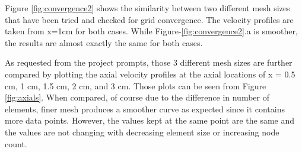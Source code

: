 \noindent Figure \ref{fig:convergence2} shows the similarity between two different mesh sizes that have been tried and checked for grid convergence. The velocity profiles are taken from x=1cm for both cases. While Figure-\ref{fig:convergence2}.a is smoother, the results are almost exactly the same for both cases.

\begin{figure}[H]
\end{figure}


\noindent As requested from the project prompts, those 3 different mesh sizes are further compared by
plotting the axial velocity profiles at the axial locations of x = 0.5 cm, 1 cm,
1.5 cm, 2 cm, and 3 cm. Those plots can be seen from Figure \ref{fig:axials}. When compared, of course due to the difference in number of elements, finer mesh produces a smoother curve as expected since it contains more data points. However, the values kept at the same point are the same and the values are not changing with decreasing element size or increasing node count.


